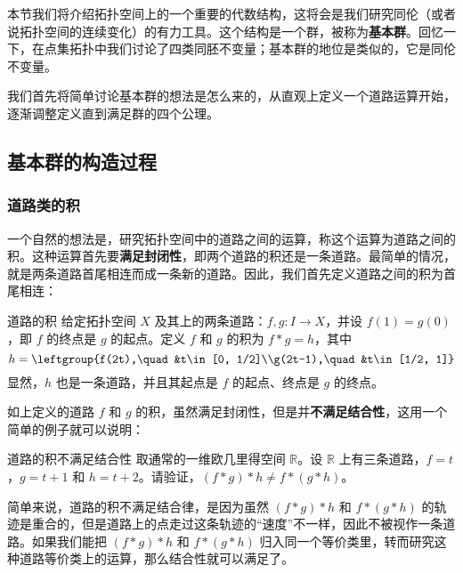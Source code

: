 
本节我们将介绍拓扑空间上的一个重要的代数结构，这将会是我们研究同伦（或者说拓扑空间的连续变化）的有力工具。这个结构是一个群，被称为\textbf{基本群}。回忆一下，在点集拓扑中我们讨论了四类同胚不变量；基本群的地位是类似的，它是同伦不变量。

我们首先将简单讨论基本群的想法是怎么来的，从直观上定义一个道路运算开始，逐渐调整定义直到满足群的四个公理。

\subsection{基本群的构造过程}
\subsubsection{道路类的积}

一个自然的想法是，研究拓扑空间中的道路之间的运算，称这个运算为道路之间的积。这种运算首先要\textbf{满足封闭性}，即两个道路的积还是一条道路。最简单的情况，就是两条道路首尾相连而成一条新的道路。因此，我们首先定义道路之间的积为首尾相连：

\begin{definition}{道路的积}\label{HomT3_def1}
给定拓扑空间 $X$ 及其上的两条道路：$f, g:I\rightarrow X$，并设 $f(1)=g(0)$，即 $f$ 的终点是 $g$ 的起点。定义 $f$ 和 $g$ 的积为 $f*g=h$，其中\begin{equation}h=\leftgroup{f(2t),\quad &t\in[0, 1/2]\\g(2t-1),\quad &t\in[1/2, 1]}\end{equation}
显然，$h$ 也是一条道路，并且其起点是 $f$ 的起点、终点是 $g$ 的终点。
\end{definition}

如上定义的道路 $f$ 和 $g$ 的积，虽然满足封闭性，但是并\textbf{不满足结合性}，这用一个简单的例子就可以说明：

\begin{exercise}{道路的积不满足结合性}
取通常的一维欧几里得空间 $\mathbb{R}$。设 $\mathbb{R}$ 上有三条道路，$f=t$，$g=t+1$ 和 $h=t+2$。请验证，$(f*g)*h\not=f*(g*h)$。
\end{exercise}

简单来说，道路的积不满足结合律，是因为虽然 $(f*g)*h$ 和 $f*(g*h)$ 的轨迹是重合的，但是道路上的点走过这条轨迹的“速度”不一样，因此不被视作一条道路。如果我们能把 $(f*g)*h$ 和 $f*(g*h)$ 归入同一个等价类里，转而研究这种道路等价类上的运算，那么结合性就可以满足了。

